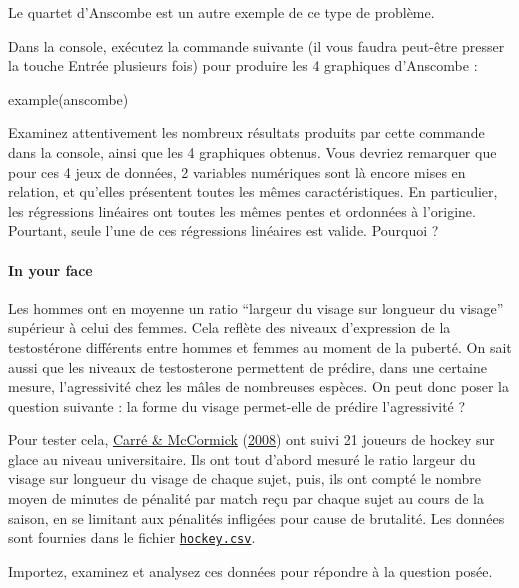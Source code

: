 \documentclass[
  a4paper,
]{article}
\newenvironment{Shaded}{\begin{snugshade}}{\end{snugshade}}
\newcommand{\FunctionTok}[1]{\textcolor[rgb]{0.39,0.29,0.61}{#1}}
\newcommand{\NormalTok}[1]{\textcolor[rgb]{0.12,0.11,0.11}{#1}}
\begin{document}
Le quartet d'Anscombe est un autre exemple de ce type de problème.

Dans la console, exécutez la commande suivante (il vous faudra peut-être presser la touche Entrée plusieurs fois) pour produire les 4 graphiques d'Anscombe :

\begin{Shaded}
\begin{Highlighting}[]
\FunctionTok{example}\NormalTok{(anscombe)}
\end{Highlighting}
\end{Shaded}

Examinez attentivement les nombreux résultats produits par cette commande dans la console, ainsi que les 4 graphiques obtenus. Vous devriez remarquer que pour ces 4 jeux de données, 2 variables numériques sont là encore mises en relation, et qu'elles présentent toutes les mêmes caractéristiques. En particulier, les régressions linéaires ont toutes les mêmes pentes et ordonnées à l'origine. Pourtant, seule l'une de ces régressions linéaires est valide. Pourquoi ?

\hypertarget{in-your-face}{%
\paragraph{In your face}\label{in-your-face}}

Les hommes ont en moyenne un ratio ``largeur du visage sur longueur du visage'' supérieur à celui des femmes. Cela reflète des niveaux d'expression de la testostérone différents entre hommes et femmes au moment de la puberté. On sait aussi que les niveaux de testosterone permettent de prédire, dans une certaine mesure, l'agressivité chez les mâles de nombreuses espèces. On peut donc poser la question suivante : la forme du visage permet-elle de prédire l'agressivité ?

Pour tester cela, \protect\hyperlink{ref-carre2008}{Carré \& McCormick} (\protect\hyperlink{ref-carre2008}{2008}) ont suivi 21 joueurs de hockey sur glace au niveau universitaire. Ils ont tout d'abord mesuré le ratio largeur du visage sur longueur du visage de chaque sujet, puis, ils ont compté le nombre moyen de minutes de pénalité par match reçu par chaque sujet au cours de la saison, en se limitant aux pénalités infligées pour cause de brutalité. Les données sont fournies dans le fichier \href{https://besibo.github.io/Biometrie3/data/hockey.csv}{\texttt{hockey.csv}}.

Importez, examinez et analysez ces données pour répondre à la question posée.
\end{document}
